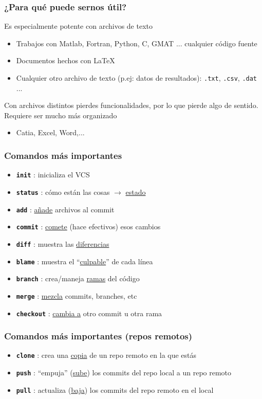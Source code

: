 \documentclass{beamer}
\begin{document}
\begin{frame}\frametitle{¿Para qué puede sernos útil?}
	Es especialmente potente con archivos de texto
	\begin{itemize}
		\item Trabajos con Matlab, Fortran, Python, C, GMAT ... cualquier código fuente
		\item Documentos hechos con \LaTeX
		\item Cualquier otro archivo de texto (p.ej: datos de resultados): \texttt{.txt}, \texttt{.csv}, \texttt{.dat} ...
	\end{itemize}
	Con archivos distintos pierdes funcionalidades, por lo que pierde algo de sentido. Requiere ser mucho más organizado
	\begin{itemize}
		\item Catia, Excel, Word,...
	\end{itemize}
\end{frame}

\begin{frame}\frametitle{Comandos más importantes}
	\begin{itemize}
		\item \textbf{\texttt{init}		}: inicializa el VCS
		\item \textbf{\texttt{status}	}: cómo están las cosas $\rightarrow$ \underline{estado}
		\item \textbf{\texttt{add}		}: \underline{añade} archivos al commit
		\item \textbf{\texttt{commit}	}: \underline{comete} (hace efectivos) esos cambios
		\item \textbf{\texttt{diff}		}: muestra las \underline{diferencias}
		\item \textbf{\texttt{blame}	}: muestra el ``\underline{culpable}'' de cada línea
		\item \textbf{\texttt{branch}	}: crea/maneja \underline{ramas} del código
		\item \textbf{\texttt{merge}	}: \underline{mezcla} commits, branches, etc
		\item \textbf{\texttt{checkout}	}: \underline{cambia a} otro commit u otra rama
	\end{itemize}
\end{frame}

\begin{frame}\frametitle{Comandos más importantes (repos remotos)}
	\begin{itemize}
		\item \textbf{\texttt{clone}	}: crea una \underline{copia} de un repo remoto en la que estás
		\item \textbf{\texttt{push}		}: ``empuja'' (\underline{sube}) los commits del repo local a un repo remoto
		\item \textbf{\texttt{pull}		}: actualiza (\underline{baja}) los commits del repo remoto en el local
	\end{itemize}
\end{frame}
\end{document}
